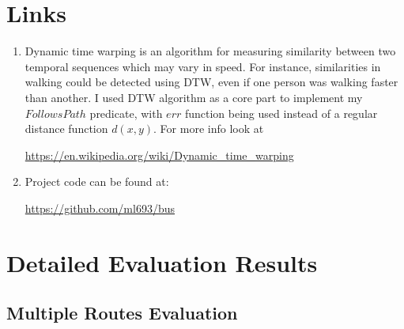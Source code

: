 \documentclass[12pt,a4paper,oneside,openright]{report}
\begin{document}
\appendix

\chapter{Links}

\begin{enumerate}
\item Dynamic time warping is an algorithm for measuring similarity between
two temporal sequences which may vary in speed. For instance, similarities in
walking could be detected using DTW, even if one person was walking faster than
another. I used DTW algorithm as a core part to implement my $FollowsPath$
predicate, with $err$ function being used instead of a regular distance function 
$d(x, y)$.
For more info look at

\textcolor{blue}{\url{https://en.wikipedia.org/wiki/Dynamic_time_warping}}

\item Project code can be found at: 

\textcolor{blue}{\url{https://github.com/ml693/bus}}


\end{enumerate}

\chapter{Detailed Evaluation Results}

\section{Multiple Routes Evaluation}

\label{B1}
\end{document}
